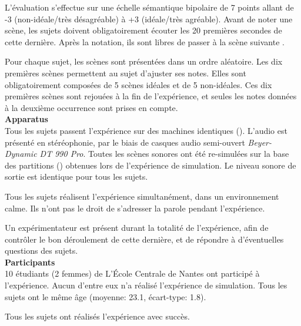 L'évaluation s'effectue sur une échelle sémantique bipolaire de 7 points allant de -3 (non-idéale/très désagréable) à +3 (idéale/très agréable). Avant de noter une scène, les sujets doivent obligatoirement écouter les 20 premières secondes de cette dernière. Après la notation, ils sont libres de passer à la scène suivante .

Pour chaque sujet, les scènes sont présentées dans un ordre aléatoire. Les dix  premières scènes permettent au sujet d'ajuster ses notes. Elles sont obligatoirement composées de 5 scènes idéales et de 5 non-idéales. Ces dix  premières scènes sont rejouées à la fin de l'expérience, et seules les notes données à la deuxième occurrence sont prises en compte. \\

\textbf{Apparatus} \\

Tous les sujets passent l'expérience sur des machines identiques (). L'audio est présenté en stéréophonie, par le biais de casques audio semi-ouvert \emph{Beyer-Dynamic DT 990 Pro}. Toutes les scènes sonores ont été re-simulées sur la base des partitions () obtenues lors de l'expérience de simulation. Le niveau sonore de sortie est identique pour tous les sujets.

Tous les sujets réalisent l'expérience simultanément, dans un environnement calme. Ils n'ont pas le droit de s'adresser la parole pendant l'expérience. 


Un expérimentateur est présent durant la totalité de l'expérience, afin de contrôler le bon déroulement de cette dernière, et de répondre à d'éventuelles questions des sujets.  \\

\textbf{Participants} \\

10 étudiants (2 femmes) de L’École Centrale de Nantes ont participé à l'expérience. Aucun d'entre eux n'a réalisé l'expérience de simulation. Tous les sujets ont   le même âge (moyenne: 23.1, écart-type: 1.8).  

Tous les sujets ont réalisés l'expérience avec succès.

